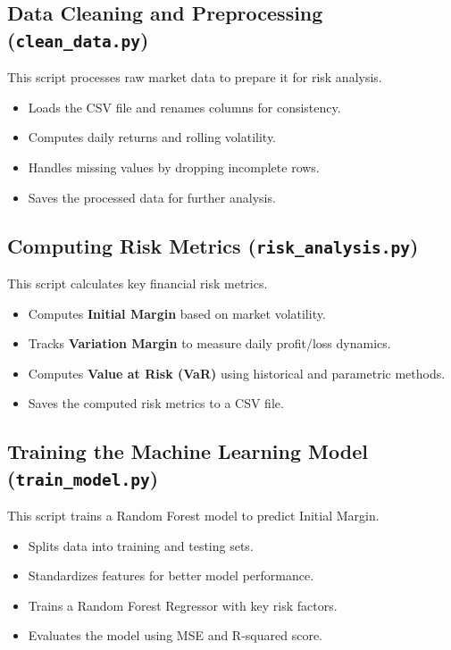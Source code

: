 \documentclass[a4paper,12pt]{article}
\begin{document}
\subsection{Data Cleaning and Preprocessing (\texttt{clean\_data.py})}
This script processes raw market data to prepare it for risk analysis.
\begin{itemize}
    \item Loads the CSV file and renames columns for consistency.
    \item Computes daily returns and rolling volatility.
    \item Handles missing values by dropping incomplete rows.
    \item Saves the processed data for further analysis.
\end{itemize}

\subsection{Computing Risk Metrics (\texttt{risk\_analysis.py})}
This script calculates key financial risk metrics.
\begin{itemize}
    \item Computes \textbf{Initial Margin} based on market volatility.
    \item Tracks \textbf{Variation Margin} to measure daily profit/loss dynamics.
    \item Computes \textbf{Value at Risk (VaR)} using historical and parametric methods.
    \item Saves the computed risk metrics to a CSV file.
\end{itemize}

\subsection{Training the Machine Learning Model (\texttt{train\_model.py})}
This script trains a Random Forest model to predict Initial Margin.
\begin{itemize}
    \item Splits data into training and testing sets.
    \item Standardizes features for better model performance.
    \item Trains a Random Forest Regressor with key risk factors.
    \item Evaluates the model using MSE and R-squared score.
\end{itemize}
\end{document}

